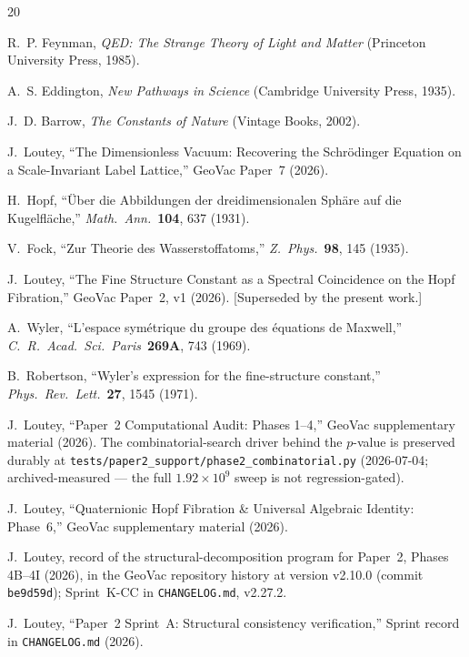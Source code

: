 \documentclass[aps,prl,twocolumn,superscriptaddress]{revtex4-2}
\begin{document}
\begin{thebibliography}{20}

R.~P. Feynman, \textit{QED: The Strange Theory of Light and Matter}
(Princeton University Press, 1985).

A.~S. Eddington, \textit{New Pathways in Science}
(Cambridge University Press, 1935).

J.~D. Barrow, \textit{The Constants of Nature}
(Vintage Books, 2002).

J.~Loutey, ``The Dimensionless Vacuum: Recovering the Schr\"odinger
Equation on a Scale-Invariant Label Lattice,'' GeoVac Paper~7 (2026).

H.~Hopf, ``\"Uber die Abbildungen der dreidimensionalen Sph\"are auf
die Kugelfl\"ache,'' \textit{Math.\ Ann.}\ \textbf{104}, 637 (1931).

V.~Fock, ``Zur Theorie des Wasserstoffatoms,''
\textit{Z.\ Phys.}\ \textbf{98}, 145 (1935).

J.~Loutey, ``The Fine Structure Constant as a Spectral Coincidence
on the Hopf Fibration,'' GeoVac Paper~2, v1 (2026). [Superseded by
the present work.]

A.~Wyler, ``L'espace sym\'etrique du groupe des \'equations de
Maxwell,'' \textit{C.\ R.\ Acad.\ Sci.\ Paris}\ \textbf{269A}, 743
(1969).

B.~Robertson, ``Wyler's expression for the fine-structure constant,''
\textit{Phys.\ Rev.\ Lett.}\ \textbf{27}, 1545 (1971).

J.~Loutey, ``Paper~2 Computational Audit: Phases 1--4,'' GeoVac
supplementary material (2026). The combinatorial-search driver behind the $p$-value is preserved
durably at \texttt{tests/paper2\_support/phase2\_combinatorial.py}
(2026-07-04; archived-measured --- the full $1.92\times10^9$ sweep is
not regression-gated).

J.~Loutey, ``Quaternionic Hopf Fibration \& Universal Algebraic
Identity: Phase~6,'' GeoVac supplementary material (2026).

J.~Loutey, record of the structural-decomposition program for
Paper~2, Phases 4B--4I (2026), in the GeoVac repository history at
version v2.10.0 (commit \texttt{be9d59d}); Sprint~K-CC in
\texttt{CHANGELOG.md}, v2.27.2.

J.~Loutey, ``Paper~2 Sprint~A: Structural consistency verification,''
Sprint record in \texttt{CHANGELOG.md} (2026).

\end{thebibliography}
\end{document}
